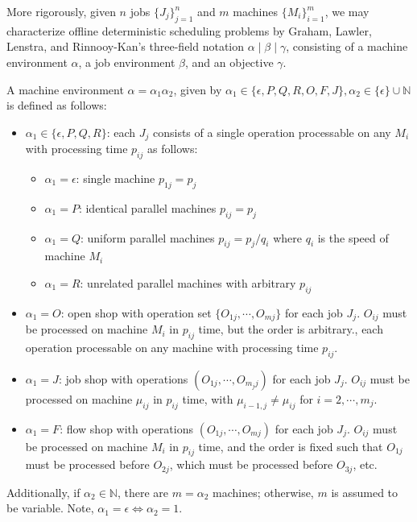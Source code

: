 More rigorously, given $n$ jobs $\{J_j\}_{j=1}^n$ and $m$ machines $\{M_i\}_{i=1}^m$, we may characterize offline deterministic scheduling problems by Graham, Lawler, Lenstra, and Rinnooy-Kan's three-field notation $\alpha \mid  \beta \mid  \gamma$, consisting of a machine environment $\alpha$, a job environment $\beta$, and an objective $\gamma$.

\begin{definition}
    A machine environment $\alpha=\alpha_1\alpha_2$, given by $\alpha_1 \in \{\epsilon,P,Q,R,O,F,J\}, \alpha_2 \in \{\epsilon\}\cup \mathbb{N}$ is defined as follows:
    \begin{itemize}
        \item $\alpha_1 \in \{\epsilon,P,Q,R\}$: each $J_j$ consists of a single operation processable on any $M_i$ with processing time $p_{ij}$ as follows:
        \begin{itemize}
            \item $\alpha_1 = \epsilon$: single machine $p_{1j}=p_j$
            \item $\alpha_1 = P$: identical parallel machines $p_{ij}=p_j$
            \item $\alpha_1 = Q$: uniform parallel machines $p_{ij} = p_j/q_i$ where $q_i$ is the speed of machine $M_i$
            \item $\alpha_1 = R$: unrelated parallel machines with arbitrary $p_{ij}$
        \end{itemize}
        \item $\alpha_1 = O$: open shop with operation set $\{O_{1j},\cdots,O_{mj}\}$ for each job $J_j$. $O_{ij}$ must be processed on machine $M_i$ in $p_{ij}$ time, but the order is arbitrary., each operation processable on any machine with processing time $p_{ij}$.
        \item $\alpha_1 = J$: job shop with operations $(O_{1j},\cdots,O_{m_j j})$ for each job $J_j$. $O_{ij}$ must be processed on machine $\mu_{ij}$ in $p_{ij}$ time, with $\mu_{i-1,j} \neq \mu_{ij}$ for $i = 2,\cdots,m_j$. 
        \item $\alpha_1 = F$: flow shop with operations $(O_{1j},\cdots,O_{mj})$ for each job $J_j$. $O_{ij}$ must be processed on machine $M_i$ in $p_{ij}$ time, and the order is fixed such that $O_{1j}$ must be processed before $O_{2j}$, which must be processed before $O_{3j}$, etc.
    \end{itemize}

    Additionally, if $\alpha_2 \in \mathbb{N}$, there are $m=\alpha_2$ machines; otherwise, $m$ is assumed to be variable. Note, $\alpha_1=\epsilon \iff \alpha_2=1$.
\end{definition}

